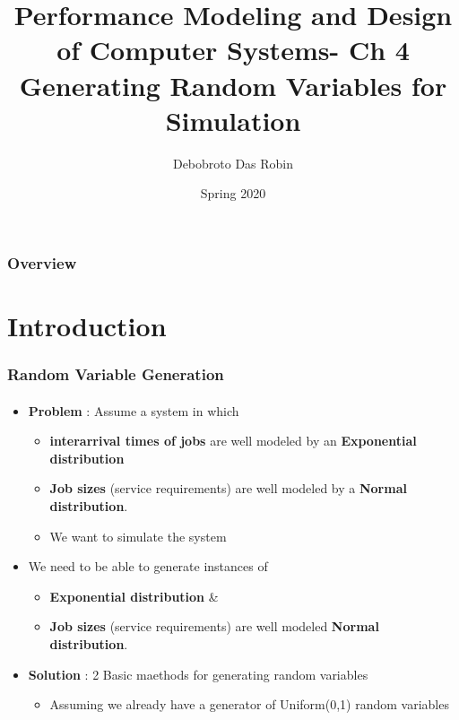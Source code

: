 \documentclass{beamer}
\title{Performance Modeling and
Design of Computer Systems- Ch 4 \\
Generating Random Variables
for Simulation
}
\author{Debobroto Das Robin} %
\institute{Kent State University}
\date{Spring 2020}
\begin{document}
\begin{frame}
        \titlepage
        \begin{center}
    \href{mailto:drobin@kent.edu}{}
        \end{center}
\end{frame}

\begin{frame}
\frametitle{Overview} %
\tableofcontents %
\end{frame}



\section{Introduction}



\begin{frame}
    \frametitle{Random Variable Generation}
    \framesubtitle{\textbf{\textit{}}}
	\begin{itemize}
	
		\item \textbf{Problem} : Assume a system in which  
			\begin{itemize}
			\item \textbf{interarrival times of jobs }are well modeled by an
						\textbf{Exponential distribution } 
			\item \textbf{Job sizes} (service requirements) are well modeled
					by a \textbf{Normal distribution}.
			\item We want to simulate the system 
			\end{itemize}
		\item We need to be able to generate instances of 
			\begin{itemize}
			\item \textbf{Exponential distribution }  \&
			\item \textbf{Job sizes} (service requirements) are well modeled
				\textbf{Normal distribution}.
			\end{itemize}
		\item \textbf{Solution } : 2 Basic maethods for generating random 						variables
			\begin{itemize}
			\item Assuming we already have a generator of Uniform(0,1) random 					variables 
			
			\end{itemize}
		  
	\end{itemize}	    
    
\end{frame}
\end{document}
